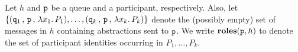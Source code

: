 \documentclass[runningheads]{llncs}
\begin{document}


\begin{definition}
Let 
$h$ and $\mathtt{p}$ be a queue 
and a participant, respectively. 
Also, let  \\
$\{(\mathtt{q}_1 \,,\, \mathtt{p} \,,\,\lambda x_1.\,P_1), \ldots, (\mathtt{q}_k \,,\, \mathtt{p} \,,\,\lambda x_k.\,P_k) \}$ 
 denote the (possibly empty) set of messages in $h$ containing abstractions sent to $\mathtt{p}$.
We write 
$\mathtt{\mathbf{roles}}(\mathtt{p}, h)$ to denote the set of participant identities occurring in 
$P_1, \ldots, P_k$.
\end{definition}




\end{document}
